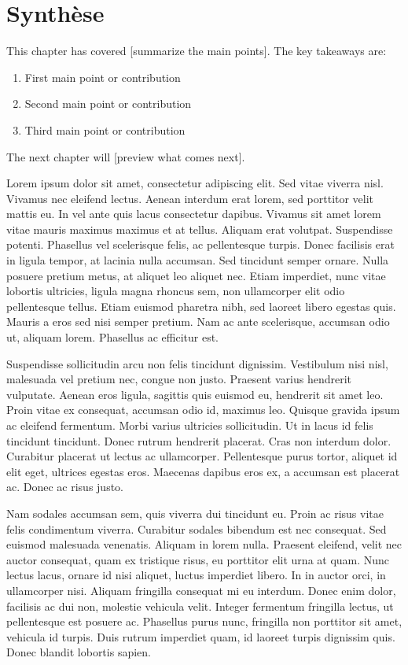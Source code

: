 \section{Synthèse}
\label{sec:detection-synthese}


This chapter has covered [summarize the main points]. The key takeaways are:

\begin{enumerate}
    \item First main point or contribution
    \item Second main point or contribution
    \item Third main point or contribution
\end{enumerate}

The next chapter will [preview what comes next].



Lorem ipsum dolor sit amet, consectetur adipiscing elit. Sed vitae viverra nisl. Vivamus nec eleifend lectus. Aenean interdum erat lorem, sed porttitor velit mattis eu. In vel ante quis lacus consectetur dapibus. Vivamus sit amet lorem vitae mauris maximus maximus et at tellus. Aliquam erat volutpat. Suspendisse potenti. Phasellus vel scelerisque felis, ac pellentesque turpis. Donec facilisis erat in ligula tempor, at lacinia nulla accumsan. Sed tincidunt semper ornare. Nulla posuere pretium metus, at aliquet leo aliquet nec. Etiam imperdiet, nunc vitae lobortis ultricies, ligula magna rhoncus sem, non ullamcorper elit odio pellentesque tellus. Etiam euismod pharetra nibh, sed laoreet libero egestas quis. Mauris a eros sed nisi semper pretium. Nam ac ante scelerisque, accumsan odio ut, aliquam lorem. Phasellus ac efficitur est.

Suspendisse sollicitudin arcu non felis tincidunt dignissim. Vestibulum nisi nisl, malesuada vel pretium nec, congue non justo. Praesent varius hendrerit vulputate. Aenean eros ligula, sagittis quis euismod eu, hendrerit sit amet leo. Proin vitae ex consequat, accumsan odio id, maximus leo. Quisque gravida ipsum ac eleifend fermentum. Morbi varius ultricies sollicitudin. Ut in lacus id felis tincidunt tincidunt. Donec rutrum hendrerit placerat. Cras non interdum dolor. Curabitur placerat ut lectus ac ullamcorper. Pellentesque purus tortor, aliquet id elit eget, ultrices egestas eros. Maecenas dapibus eros ex, a accumsan est placerat ac. Donec ac risus justo.

Nam sodales accumsan sem, quis viverra dui tincidunt eu. Proin ac risus vitae felis condimentum viverra. Curabitur sodales bibendum est nec consequat. Sed euismod malesuada venenatis. Aliquam in lorem nulla. Praesent eleifend, velit nec auctor consequat, quam ex tristique risus, eu porttitor elit urna at quam. Nunc lectus lacus, ornare id nisi aliquet, luctus imperdiet libero. In in auctor orci, in ullamcorper nisi. Aliquam fringilla consequat mi eu interdum. Donec enim dolor, facilisis ac dui non, molestie vehicula velit. Integer fermentum fringilla lectus, ut pellentesque est posuere ac. Phasellus purus nunc, fringilla non porttitor sit amet, vehicula id turpis. Duis rutrum imperdiet quam, id laoreet turpis dignissim quis. Donec blandit lobortis sapien.

